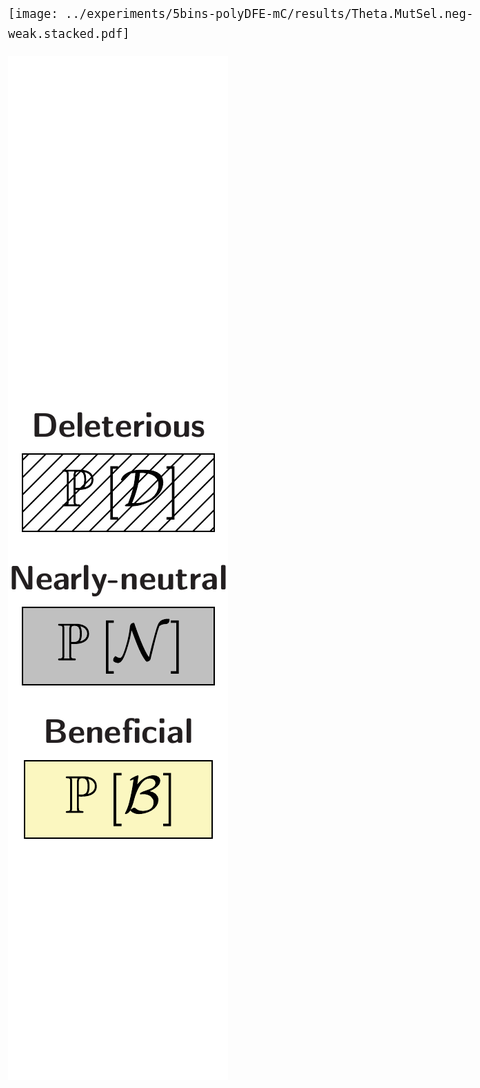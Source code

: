 \documentclass{article}
\begin{document}
\begin{center}
\begin{minipage}{0.09\linewidth}
        \end{minipage}
        \begin{minipage}{0.9\linewidth}
            \texttt{[image: ../experiments/5bins-polyDFE-mC/results/Theta.MutSel.neg-weak.stacked.pdf]} \\
        \end{minipage}
        \begin{minipage}{0.09\linewidth}
            \includegraphics[width=\linewidth, page=1]{artworks/legend.polycat}

\end{minipage}
\end{center}
\end{document}
